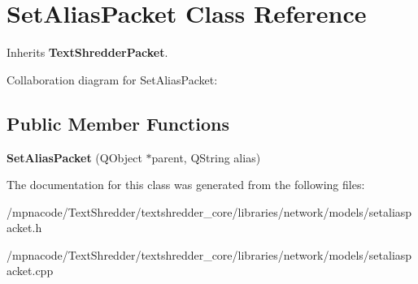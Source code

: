 \section{SetAliasPacket Class Reference}
\label{class_set_alias_packet}


Inherits {\bf TextShredderPacket}.



Collaboration diagram for SetAliasPacket:
\subsection*{Public Member Functions}
\begin{DoxyCompactItemize}
\item 
{\bfseries SetAliasPacket} (QObject $\ast$parent, QString alias)\label{class_set_alias_packet_a021c20f181919078df141c279e1eb8b4}

\end{DoxyCompactItemize}


The documentation for this class was generated from the following files:\begin{DoxyCompactItemize}
\item 
/mpnacode/TextShredder/textshredder\_\-core/libraries/network/models/setaliaspacket.h\item 
/mpnacode/TextShredder/textshredder\_\-core/libraries/network/models/setaliaspacket.cpp\end{DoxyCompactItemize}
